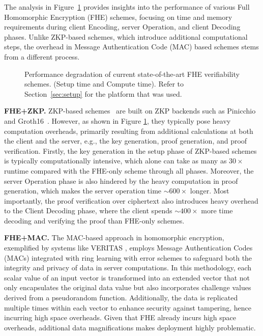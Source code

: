 The analysis in Figure~\ref{fig:mot} provides insights into the performance of various Full Homomorphic Encryption (FHE) schemes, focusing on time and memory requirements during client Encoding, server Operation, and client Decoding phases. Unlike ZKP-based schemes, which introduce additional computational steps, the overhead in Message Authentication Code (MAC) based schemes stems from a different process. 




\begin{figure}[ht]
    \centering
    \hspace{-0.5cm}
    
    \caption{Performance degradation of current state-of-the-art FHE verifiability schemes. (Setup time and Compute time). Refer to Section~\ref{sec:setup} for the platform that was used.}
    \label{fig:mot}
\end{figure}


\noindent\textbf{FHE+ZKP.}
ZKP-based schemes~\cite{ganesh2021rinocchio} are built on ZKP backends such as Pinicchio~\cite{parno2016pinocchio} and Groth16~\cite{groth2016sgroth16}. However, as shown in Figure \ref{fig:mot}, they typically pose heavy computation overheads, primarily resulting from additional calculations at both the client and the server, e.g., the key generation, proof generation, and proof verification. Firstly, the key generation in the setup phase of ZKP-based schemes is typically computationally intensive, which alone can take as many as $30\times$ runtime compared with the FHE-only scheme through all phases. Moreover, the server Operation phase is also hindered by the heavy computation in proof generation, which makes the server operation time $\sim600\times$ longer. Most importantly, the proof verification over ciphertext also introduces heavy overhead to the Client Decoding phase, where the client spends $\sim400 \times$ more time decoding and verifying the proof than FHE-only schemes. 

\noindent\textbf{FHE+MAC.}
The MAC-based approach in homomorphic encryption, exemplified by systems like VERITAS \cite{chatel2022verifiable}, employs Message Authentication Codes (MACs) integrated with ring learning with error schemes to safeguard both the integrity and privacy of data in server computations. In this methodology, each scalar value of an input vector is transformed into an extended vector that not only encapsulates the original data value but also incorporates challenge values derived from a pseudorandom function. Additionally, the data is replicated multiple times within each vector to enhance security against tampering, hence incurring high space overheads. Given that FHE already incurs high space overheads, additional data magnifications makes deployment highly problematic. 

